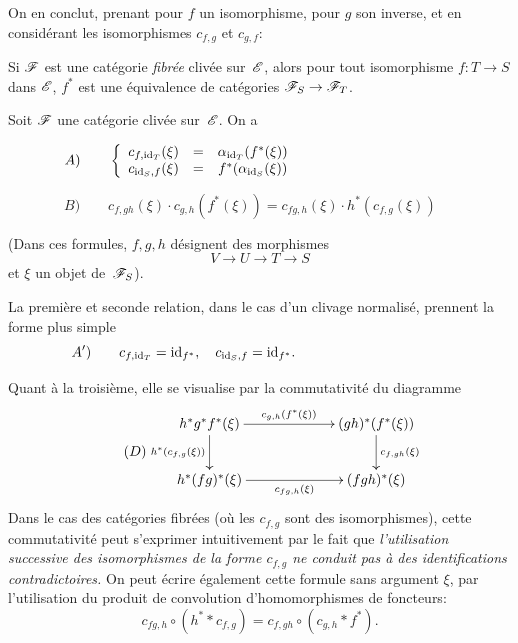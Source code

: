 On en conclut, prenant pour $f$ un isomorphisme, pour $g$ son inverse,
et en consid\'erant les isomorphismes $c_{f,g}$ et $c_{g,f}$:
\begin{corollaire}
\label{VI.7.3} Si $\cal{F}$ est une cat\'egorie \emph{fibrée}
cliv\'ee sur~$\cal{E}$, alors pour tout isomorphisme $f\colon T\to
S$ dans $\cal{E}$, $f^*$ est une \'equivalence de cat\'egories
$\cal{F}_S\to \cal{F}_T$.
\end{corollaire}

\begin{proposition}
\label{VI.7.4} Soit $\cal{F}$ une cat\'egorie cliv\'ee sur~$\cal{E}$.
On a

$\qquad\qquad A)\qquad
\left\{\begin{array}{ccc}c_{f,\mathrm{id}_T}(\xi)&=&\alpha_{\mathrm{id}_T}(f^*(\xi))\\
c_{\mathrm{id}_S,f}(\xi)&=&f^*(\alpha_{\mathrm{id}_S}(\xi))
\end{array}\right.$

\smallskip
$\qquad\qquad B)\qquad c_{f,gh}(\xi)\cdot
c_{g,h}(f^*(\xi))=c_{fg,h}(\xi)\cdot h^*(c_{f,g}(\xi))$

\noindent(Dans
ces formules, $f,g,h$ d\'esignent des morphismes
$$
V\to U\to T\to S
$$
et $\xi$ un objet de~$\cal{F}_S$).
\end{proposition}

La premi\`ere et seconde relation, dans le cas d'un clivage
normalis\'e, prennent la forme plus simple
\begin{equation*}
\label{eq:VI.7.A'}\quad A')\qquad {c_{f,\mathrm{id}_T}=\mathrm{id}_{f^*},\quad
c_{\mathrm{id}_S,f}=\mathrm{id}_{f^*}.\qquad\qquad\qquad\qquad\qquad\qquad}
\end{equation*}

Quant \`a la troisi\`eme, elle se visualise par la
commutativit\'e du diagramme
\begin{equation*}
\label{eq:VI.7.D} \tag{$D$}
\begin{split}
\xymatrix@C=2.2cm{{h^*g^*f^*(\xi)}\ar[r]^-{c_{g,h}(f^*(\xi))}\ar[d]_{h^*(c_{f,g}(\xi))}&{(gh)^*(f^*(\xi))}\ar[d]^{c_{f,gh}(\xi)}\\{h^*(fg)^*(\xi)}\ar[r]_-{c_{fg,h}(\xi)}&{(fgh)^*(\xi)}}
\end{split}
\end{equation*}
Dans le cas des cat\'egories
fibr\'ees
(o\`u les $c_{f,g}$ sont des isomorphismes), cette commutativit\'e
peut s'exprimer intuitivement par le fait que \emph{l'utilisation
successive des isomorphismes de la forme $c_{f,g}$ ne conduit pas
à des \og identifications contradictoires\fg.} On peut \'ecrire
\'egalement cette formule sans argument $\xi$, par l'utilisation du
produit de convolution d'homomorphismes de foncteurs:
$$
c_{fg,h}\circ (h^**c_{f,g})=c_{f,gh}\circ(c_{g,h}*f^*).
$$

